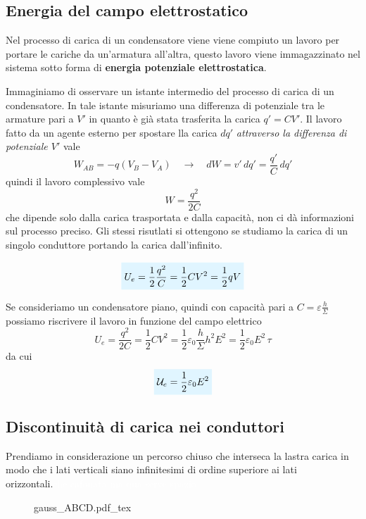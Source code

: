 \documentclass[x11names]{report}
\newcommand{\incfig}[1]{%
	{#1.pdf_tex}
}
\newcommand{\viola}[1]{%
	\colorbox{myblue}{$\displaystyle #1$}
}
\begin{document}
\subsection{Energia del campo elettrostatico}
Nel processo di carica di un condensatore viene viene compiuto un lavoro per portare le cariche da un'armatura all'altra, questo lavoro viene immagazzinato nel sistema sotto forma di \textbf{energia potenziale elettrostatica}.

Immaginiamo di osservare un istante intermedio del processo di carica di un condensatore. In tale istante misuriamo una differenza di potenziale tra le armature pari a \(V'\) in quanto è già stata trasferita la carica \(q' = CV'\). Il lavoro fatto da un agente esterno per spostare lla carica \(dq'\) \textit{attraverso la differenza di potenziale \(V'\)} vale
\[
W_{AB} = -q(V_B-V_A) \quad \to \quad dW = v'\, dq' = \frac{q'}{C}\, dq'
\]
quindi il lavoro complessivo vale
\[
W = \frac{q^2}{2C}
\]
che dipende solo dalla carica trasportata e dalla capacità, non ci dà informazioni sul processo preciso. Gli stessi risutlati si ottengono se studiamo la carica di un singolo conduttore portando la carica dall'infinito.

\begin{equation}
	\viola{U_e = \frac{1}{2}\frac{q^2}{C} = \frac{1}{2}CV^2 = \frac{1}{2}qV}
\end{equation}

Se consideriamo un condensatore piano, quindi con capacità pari a \(C=\varepsilon\frac{h}{\Sigma}\) possiamo riscrivere il lavoro in funzione del campo elettrico
\[
U_e = \frac{q^2}{2C}  = \frac{1}{2}CV^2 =  \frac{1}{2}\varepsilon_0\frac{h}{\Sigma}h^2E^2 = \frac{1}{2}\varepsilon_0 E^2\,  \tau
\]
da cui
\begin{equation}
	\viola{\mathcal{U}_e = \frac{1}{2}\varepsilon_0 E^2}
\end{equation}

\subsection{Discontinuità di carica nei conduttori}
Prendiamo in considerazione un percorso chiuso che interseca la lastra carica in modo che i lati verticali siano infinitesimi di ordine superiore ai lati orizzontali.\textcolor{white}{che cafonata ma qua serve spazio}
\begin{wrapfigure}{r}{0.5\textwidth}
	\hspace{1cm}
	\incfig{gauss_ABCD}
\end{wrapfigure}
\end{document}
